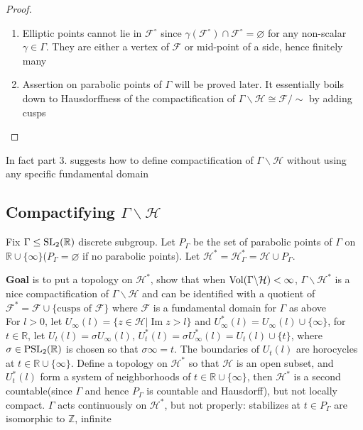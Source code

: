 \documentclass[main]{subfiles}
\begin{document}
\begin{proof}
\begin{enumerate}[label=\roman*]
\begin{enumerate}[label=\alph*)]
\end{enumerate}
\item Elliptic points cannot lie in $\mathcal F^\circ$ since $\gamma(\mathcal F^\circ)\cap \mathcal F^\circ=\varnothing$ for any non-scalar $\gamma\in\Gamma$. They are either a vertex of $\mathcal F$ or mid-point of a side, hence finitely many
\item Assertion on parabolic points of $\Gamma$ will be proved later. It essentially boils down to Hausdorffness of the compactification of $\Gamma\backslash\mathcal H\cong \mathcal F/\sim$ by adding cusps
\end{enumerate}
\end{proof}

\begin{remark}
In fact part 3. suggests how to define compactification of $\Gamma\backslash\mathcal H$ without using any specific fundamental domain
\end{remark}

\subsection{Compactifying $\Gamma\backslash\mathcal H$}

Fix $\Gamma\leq \operatorname{SL}_2(\mathbb R)$ discrete subgroup. Let $P_\Gamma$ be the set of parabolic points of $\Gamma$ on $\mathbb R\cup\{\infty\}$($P_\Gamma=\varnothing$ if no parabolic points). Let $\mathcal H^*=\mathcal H^*_\Gamma=\mathcal H\cup P_\Gamma$.

\textbf{Goal} is to put a topology on $\mathcal H^*$, show that when $\operatorname{Vol}(\Gamma\backslash\mathcal H)<\infty$, $\Gamma\backslash\mathcal H^*$ is a nice compactification of $\Gamma\backslash\mathcal H$ and can be identified with a quotient of $\mathcal F^*=\mathcal F\cup\{\text{cusps of }\mathcal F\}$ where $\mathcal F$ is a fundamental domain for $\Gamma$ as above \\
For $l>0$, let $U_\infty(l)=\{z\in\mathcal H|\operatorname{Im} z>l\}$ and $U^*_\infty(l)=U_\infty(l)\cup\{\infty\}$, for $t\in\mathbb R$, let $U_t(l)=\sigma U_\infty(l)$, $U^*_t(l)=\sigma U^*_\infty(l)=U_t(l)\cup\{t\}$, where $\sigma\in\operatorname{PSL}_2(\mathbb R)$ is chosen so that $\sigma\infty=t$. The boundaries of $U_t(l)$ are horocycles at $t\in\mathbb R\cup\{\infty\}$. Define a topology on $\mathcal H^*$ so that $\mathcal H$ is an open subset, and $U^*_t(l)$ form a system of neighborhoods of $t\in\mathbb R\cup\{\infty\}$, then $\mathcal H^*$ is a second countable(since $\Gamma$ and hence $P_\Gamma$ is countable and Hausdorff), but not locally compact. $\Gamma$ acts continuously on $\mathcal H^*$, but not properly: stabilizes at $t\in P_\Gamma$ are isomorphic to $\mathbb Z$, infinite
\end{document}
